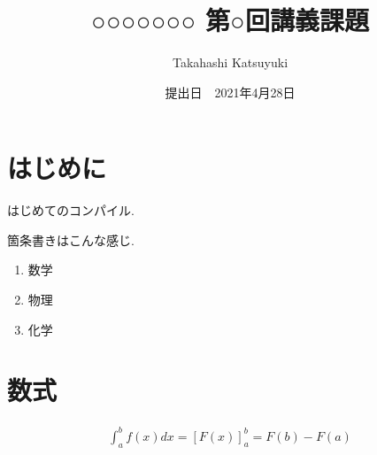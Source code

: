 \documentclass{jsarticle}
\title{○○○○○○○ 第○回講義課題}
\date{提出日　2021年4月28日}
\author{Takahashi Katsuyuki}
\begin{document}
\maketitle

\newpage



\section{はじめに}
はじめてのコンパイル.


箇条書きはこんな感じ.

\begin{enumerate}
  \item 数学
  \item 物理
  \item 化学
\end{enumerate}

\section{数式}

\begin{align}
    \int^b_a f(x) dx = \left[F(x)\right]^b_a = F(b) - F(a)
\end{align}
\end{document}
